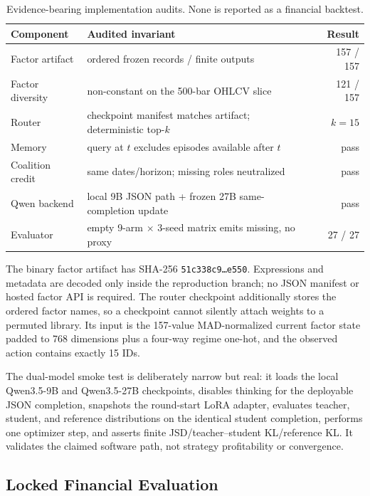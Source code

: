 \begin{table}[t]
\centering
\small
\caption{Evidence-bearing implementation audits. None is reported as a financial backtest.}
\label{tab:component_audit}
\setlength{\tabcolsep}{3pt}
\begin{tabularx}{\columnwidth}{lXr}
\toprule
Component & Audited invariant & Result \\
\midrule
Factor artifact & ordered frozen records / finite outputs & 157 / 157 \\
Factor diversity & non-constant on the 500-bar OHLCV slice & 121 / 157 \\
Router & checkpoint manifest matches artifact; deterministic top-$k$ & $k=15$ \\
Memory & query at $t$ excludes episodes available after $t$ & pass \\
Coalition credit & same dates/horizon; missing roles neutralized & pass \\
Qwen backend & local 9B JSON path + frozen 27B same-completion update & pass \\
Evaluator & empty 9-arm $\times$ 3-seed matrix emits missing, no proxy & 27 / 27 \\
\bottomrule
\end{tabularx}
\end{table}

The binary factor artifact has SHA-256 \texttt{51c338c9\ldots e550}. Expressions and metadata are decoded only inside the reproduction branch; no JSON manifest or hosted factor API is required. The router checkpoint additionally stores the ordered factor names, so a checkpoint cannot silently attach weights to a permuted library. Its input is the 157-value MAD-normalized current factor state padded to 768 dimensions plus a four-way regime one-hot, and the observed action contains exactly 15 IDs.

The dual-model smoke test is deliberately narrow but real: it loads the local Qwen3.5-9B and Qwen3.5-27B checkpoints, disables thinking for the deployable JSON completion, snapshots the round-start LoRA adapter, evaluates teacher, student, and reference distributions on the identical student completion, performs one optimizer step, and asserts finite JSD/teacher--student KL/reference KL. It validates the claimed software path, not strategy profitability or convergence.

\subsection{Locked Financial Evaluation}

